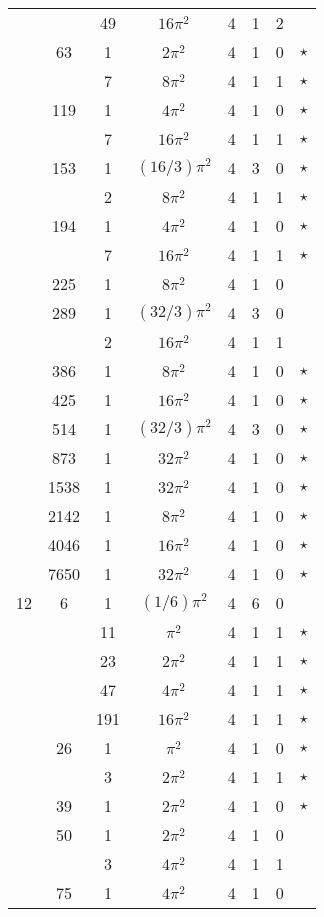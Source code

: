 \documentclass[12pt]{amsart}
\begin{document}
\begin{tabular}{ccc|ccccc}
 &  & 49 & $16\pi^2$ & 4 & 1 & 2 &  \\
 & 63 & 1 & $2\pi^2$ & 4 & 1 & 0 & $\star$ \\
 &  & 7 & $8\pi^2$ & 4 & 1 & 1 & $\star$ \\
 & 119 & 1 & $4\pi^2$ & 4 & 1 & 0 & $\star$ \\
 &  & 7 & $16\pi^2$ & 4 & 1 & 1 & $\star$ \\
 & 153 & 1 & $(16/3)\pi^2$ & 4 & 3 & 0 & $\star$ \\
 &  & 2 & $8\pi^2$ & 4 & 1 & 1 & $\star$ \\
 & 194 & 1 & $4\pi^2$ & 4 & 1 & 0 & $\star$ \\
 &  & 7 & $16\pi^2$ & 4 & 1 & 1 & $\star$ \\
 & 225 & 1 & $8\pi^2$ & 4 & 1 & 0 &  \\
 & 289 & 1 & $(32/3)\pi^2$ & 4 & 3 & 0 &  \\
 &  & 2 & $16\pi^2$ & 4 & 1 & 1 &  \\
 & 386 & 1 & $8\pi^2$ & 4 & 1 & 0 & $\star$ \\
 & 425 & 1 & $16\pi^2$ & 4 & 1 & 0 & $\star$ \\
 & 514 & 1 & $(32/3)\pi^2$ & 4 & 3 & 0 & $\star$ \\
 & 873 & 1 & $32\pi^2$ & 4 & 1 & 0 & $\star$ \\
 & 1538 & 1 & $32\pi^2$ & 4 & 1 & 0 & $\star$ \\
 & 2142 & 1 & $8\pi^2$ & 4 & 1 & 0 & $\star$ \\
 & 4046 & 1 & $16\pi^2$ & 4 & 1 & 0 & $\star$ \\
 & 7650 & 1 & $32\pi^2$ & 4 & 1 & 0 & $\star$ \\
12 & 6 & 1 & $(1/6)\pi^2$ & 4 & 6 & 0 &  \\
 &  & 11 & $\pi^2$ & 4 & 1 & 1 & $\star$ \\
 &  & 23 & $2\pi^2$ & 4 & 1 & 1 & $\star$ \\
 &  & 47 & $4\pi^2$ & 4 & 1 & 1 & $\star$ \\
 &  & 191 & $16\pi^2$ & 4 & 1 & 1 & $\star$ \\
 & 26 & 1 & $\pi^2$ & 4 & 1 & 0 & $\star$ \\
 &  & 3 & $2\pi^2$ & 4 & 1 & 1 & $\star$ \\
 & 39 & 1 & $2\pi^2$ & 4 & 1 & 0 & $\star$ \\
 & 50 & 1 & $2\pi^2$ & 4 & 1 & 0 &  \\
 &  & 3 & $4\pi^2$ & 4 & 1 & 1 &  \\
 & 75 & 1 & $4\pi^2$ & 4 & 1 & 0 &  \\

\end{tabular}
\end{document}
